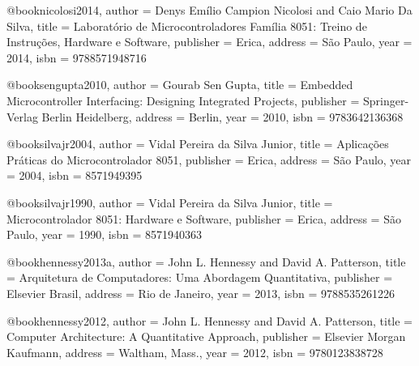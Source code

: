 @book{nicolosi2014,
  author = {Denys Emílio Campion Nicolosi and Caio Mario Da Silva},
  title = {Laboratório de Microcontroladores Família 8051: Treino de Instruções, Hardware e Software},
  publisher = {Erica},
  address = {São Paulo},
  year = {2014},
  isbn = {9788571948716}
}

@book{sengupta2010,
  author = {Gourab Sen Gupta},
  title = {Embedded Microcontroller Interfacing: Designing Integrated Projects},
  publisher = {Springer-Verlag Berlin Heidelberg},
  address = {Berlin},
  year = {2010},
  isbn = {9783642136368}
}

@book{silvajr2004,
  author = {Vidal Pereira da Silva Junior},
  title = {Aplicações Práticas do Microcontrolador 8051},
  publisher = {Erica},
  address = {São Paulo},
  year = {2004},
  isbn = {8571949395}
}

@book{silvajr1990,
  author = {Vidal Pereira da Silva Junior},
  title = {Microcontrolador 8051: Hardware e Software},
  publisher = {Erica},
  address = {São Paulo},
  year = {1990},
  isbn = {8571940363}
}

@book{hennessy2013a,
  author = {John L. Hennessy and David A. Patterson},
  title = {Arquitetura de Computadores: Uma Abordagem Quantitativa},
  publisher = {Elsevier Brasil},
  address = {Rio de Janeiro},
  year = {2013},
  isbn = {9788535261226}
}

@book{hennessy2012,
  author = {John L. Hennessy and David A. Patterson},
  title = {Computer Architecture: A Quantitative Approach},
  publisher = {Elsevier Morgan Kaufmann},
  address = {Waltham, Mass.},
  year = {2012},
  isbn = {9780123838728}
}

